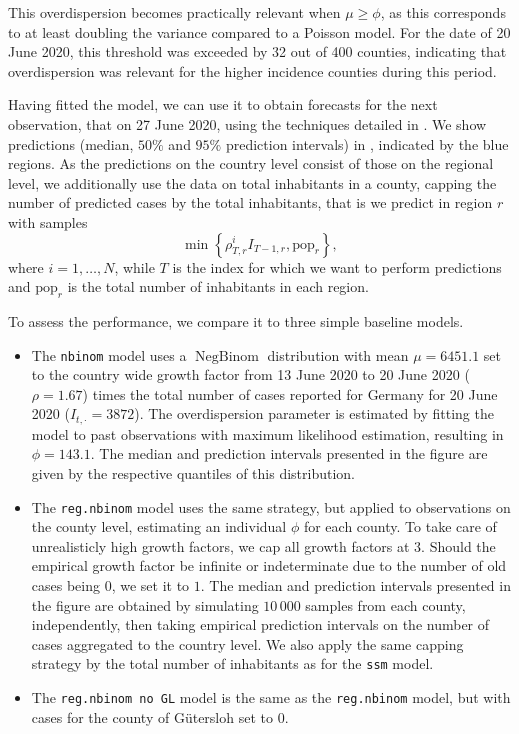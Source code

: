 This overdispersion becomes practically relevant when $\mu \geq \phi$, as this corresponds to at least doubling the variance compared to a Poisson model. For the date of 20 June 2020, this threshold was exceeded by 32 out of 400 counties, indicating that overdispersion was relevant for the higher incidence counties during this period.

Having fitted the model, we can use it to obtain forecasts for the next observation, that on 27 June 2020, using the techniques detailed in . We show predictions (median, $50\%$ and $95\%$ prediction intervals) in , indicated by the blue regions. As the predictions on the country level consist of those on the regional level, we additionally use the data on total inhabitants in a county, capping the number of predicted cases by the total inhabitants, that is we predict in region $r$ with samples
$$
    \min \left\{\rho^{i}_{T,r}I_{T-1,r}, \text{pop}_{r}\right\},
$$
where $i=1,\dots,N$, while $T$ is the index for which we want to perform predictions and $\text{pop}_{r}$ is the total number of inhabitants in each region.

To assess the performance, we compare it to three simple baseline models. 

\begin{itemize}
    \item The \texttt{nbinom} model uses a $ \operatorname{NegBinom}$ distribution with mean $\mu = 6451.1$ set to the country wide growth factor from 13 June 2020 to 20 June 2020 ($\rho = 1.67$) times the total number of cases reported for Germany for 20 June 2020 ($I_{t,\cdot} = 3872$). The overdispersion parameter is estimated by fitting the model to past observations with maximum likelihood estimation, resulting in $\phi = 143.1$. The median and prediction intervals presented in the figure are given by the respective quantiles of this distribution.
    \item The \texttt{reg.nbinom} model uses the same strategy, but applied to observations on the county level, estimating an individual $\phi$ for each county. To take care of unrealisticly high growth factors, we cap all growth factors at $3$. Should the empirical growth factor be infinite or indeterminate due to the number of old cases being $0$, we set it to $1$.  The median and prediction intervals presented in the figure are obtained by simulating $10\,000$ samples from each county, independently, then taking empirical prediction intervals on the number of cases aggregated to the country level. We also apply the same capping strategy by the total number of inhabitants as for the \texttt{ssm} model.
    \item The \texttt{reg.nbinom no GL} model is the same as the \texttt{reg.nbinom} model, but with cases for the county of Gütersloh set to $0$. 
\end{itemize}


